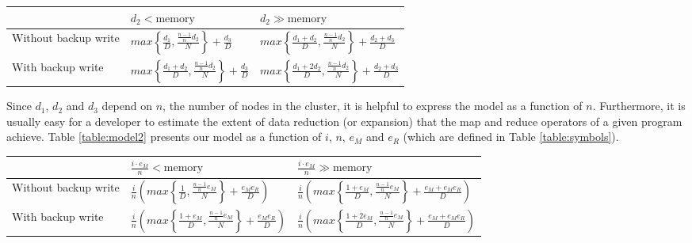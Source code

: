 \documentclass[ 11pt, letterpaper]{article}%
\begin{document}
\begin{table*}
\centering
\renewcommand{\arraystretch}{1.2}
\begin{tabular}{|l|l|l|}
\hline
& $d_2 < \text{memory}$ & $d_2 \gg \text{memory}$ \\ \hline
Without backup write & $max\left\{\frac{d_1}{D},
\frac{\frac{n-1}{n} d_2}{N}\right\} + \frac{d_3}{D}$ & $max\left\{\frac{d_1 +
d_2}{D}, \frac{\frac{n-1}{n} d_2}{N}\right\} + \frac{d_2 + d_3}{D}$ \\ \hline
With backup write & $max\left\{\frac{d_1 + d_2}{D}, \frac{\frac{n-1}{n} d_2}{N}\right\} +
\frac{d_3}{D}$ & $max\left\{\frac{d_1 + 2 d_2}{D},
\frac{\frac{n-1}{n} d_2}{N}\right\} + \frac{d_2 + d_3}{D}$ \\ \hline
\end{tabular}
\caption{The execution time of a map-reduce computation on a parallel dataflow system.}
\label{table:model1}
\end{table*}

Since $d_1$, $d_2$ and $d_3$ depend on $n$, the number of nodes in the cluster,
it is helpful to express the model as a function of $n$. Furthermore, it is
usually easy for a developer to estimate  the extent of data reduction (or
expansion) that the map and reduce operators of a given program achieve. Table
\ref{table:model2} presents our model as a function of $i$, $n$, $e_M$ and
$e_R$ (which are defined in Table \ref{table:symbols}).

\begin{table*}
\centering
\renewcommand{\arraystretch}{1.2}
\begin{tabular}{|l|l|l|}
\hline
& $\frac{i \cdot e_M}{n}< \text{memory}$ & $\frac{i \cdot e_M}{n} \gg \text{memory}$ \\ \hline
Without backup write & $\frac{i}{n} \left( max\left\{\frac{1}{D},
\frac{\frac{n-1}{n} e_M}{N}\right\} + \frac{e_M e_R}{D} \right)$ & $\frac{i}{n}
\left( max\left\{\frac{1 + e_M}{D}, \frac{\frac{n-1}{n} e_M}{N}\right\} +
\frac{e_M + e_M e_R}{D} \right)$ \\ \hline With backup write & $\frac{i}{n}
\left( max\left\{\frac{1 + e_M}{D}, \frac{\frac{n-1}{n} e_M}{N}\right\} +
\frac{e_M e_R}{D} \right)$ & $\frac{i}{n} \left( max\left\{\frac{1 + 2 e_M}{D},
\frac{\frac{n-1}{n} e_M}{N}\right\} + \frac{e_M + e_M e_R}{D} \right)$ \\ \hline
\end{tabular}
\caption{The execution time of a map-reduce computation on a parallel dataflow system, as a function of the total amount of input data ($i$), and the map-reduce data expansion ratios ($e_M$ and $e_R$).}
\label{table:model2}
\end{table*}
\end{document}
